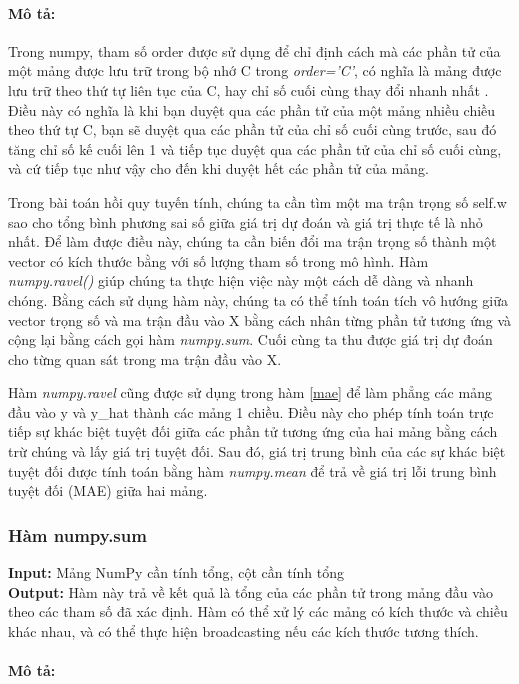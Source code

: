 \documentclass[]{article}
\begin{document}
\paragraph{Mô tả:}

Trong numpy, tham số order được sử dụng để chỉ định cách mà các phần tử của một mảng được lưu trữ trong bộ nhớ C trong \textit{order='C'}, có nghĩa là mảng được lưu trữ theo thứ tự liên tục của C, hay chỉ số cuối cùng thay đổi nhanh nhất \cite{stackoverflowCOrder}. Điều này có nghĩa là khi bạn duyệt qua các phần tử của một mảng nhiều chiều theo thứ tự C, bạn sẽ duyệt qua các phần tử của chỉ số cuối cùng trước, sau đó tăng chỉ số kế cuối lên 1 và tiếp tục duyệt qua các phần tử của chỉ số cuối cùng, và cứ tiếp tục như vậy cho đến khi duyệt hết các phần tử của mảng.

Trong bài toán hồi quy tuyến tính, chúng ta cần tìm một ma trận trọng số self.w sao cho tổng bình phương sai số giữa giá trị dự đoán và giá trị thực tế là nhỏ nhất. Để làm được điều này, chúng ta cần biến đổi ma trận trọng số thành một vector có kích thước bằng với số lượng tham số trong mô hình. Hàm \textit{numpy.ravel()} \cite{numpyNumpyravel} giúp chúng ta thực hiện việc này một cách dễ dàng và nhanh chóng. Bằng cách sử dụng hàm này, chúng ta có thể tính toán tích vô hướng giữa vector trọng số và ma trận đầu vào X bằng cách nhân từng phần tử tương ứng và cộng lại bằng cách gọi hàm \textit{numpy.sum}. Cuối cùng ta thu được giá trị dự đoán cho từng quan sát trong ma trận đầu vào X.

Hàm \textit{numpy.ravel} cũng được sử dụng trong hàm \ref{mae} để làm phẳng các mảng đầu vào y và y\_hat thành các mảng 1 chiều. Điều này cho phép tính toán trực tiếp sự khác biệt tuyệt đối giữa các phần tử tương ứng của hai mảng bằng cách trừ chúng và lấy giá trị tuyệt đối. Sau đó, giá trị trung bình của các sự khác biệt tuyệt đối được tính toán bằng hàm \textit{numpy.mean} để trả về giá trị lỗi trung bình tuyệt đối (MAE) giữa hai mảng.

\subsubsection{Hàm numpy.sum}
\noindent
\textbf{Input:} Mảng NumPy cần tính tổng, cột cần tính tổng \\
\textbf{Output:} Hàm này trả về kết quả là tổng của các phần tử trong mảng đầu vào theo các tham số đã xác định. Hàm có thể xử lý các mảng có kích thước và chiều khác nhau, và có thể thực hiện broadcasting nếu các kích thước tương thích.
\paragraph{Mô tả:}
\end{document}
